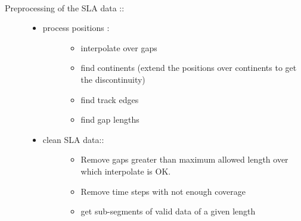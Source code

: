 \documentclass[letterpaper,10pt,english]{sphinxmanual}
\begin{document}
\begin{fulllineitems}
\label{altimetry.tools.spectrum:altimetry.tools.spectrum.preprocess}~\begin{description}
\item[{Preprocessing of the SLA data ::}] \leavevmode\begin{itemize}
\item {} \begin{description}
\item[{process positions :}] \leavevmode\begin{itemize}
\item {} 
interpolate over gaps

\item {} 
find continents (extend the positions over continents to get the discontinuity)

\item {} 
find track edges

\item {} 
find gap lengths

\end{itemize}

\end{description}

\item {} \begin{description}
\item[{clean SLA data::}] \leavevmode\begin{itemize}
\item {} 
Remove gaps greater than maximum allowed length over which interpolate is OK.

\item {} 
Remove time steps with not enough coverage

\item {} 
get sub-segments of valid data of a given length

\end{itemize}

\end{description}


\end{itemize}
\end{description}
\end{fulllineitems}
\end{document}
